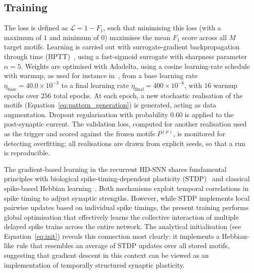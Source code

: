 \documentclass{scrartcl}
\newcommand{\citep}[1]{\parencite{#1}}
\begin{document}
\subsection{Training}
The loss is defined as $\mathcal{L} = 1 - F_1$, such that minimising this loss (with a maximum of $1$ and minimum of $0$) maximises the mean $F_1$ score across all $M$ target motifs. Learning is carried out with surrogate-gradient backpropagation through time (BPTT)~\citep{Neftci2019a}, using a fast-sigmoid surrogate with sharpness parameter $\alpha = 5$. Weights are optimised with Adadelta, using a cosine learning-rate schedule with warmup, as used for instance in~\citep{Hammouamri2023}, from a base learning rate $\eta_\mathrm{base} = 40.0 \times 10^{-3}$ to a final learning rate $\eta_\mathrm{final} = 400 \times 10^{-6}$, with $16$ warmup epochs over $256$ total epochs. At each epoch, a new stochastic realisation of the motifs (Equation~\ref{eq:pattern_generation}) is generated, acting as data augmentation. Dropout regularisation with probability $0.60$ is applied to the post-synaptic current. The validation loss, computed for another realisation used as the trigger and scored against the frozen motifs $P^{(\mu)}$, is monitored for detecting overfitting; all realisations are drawn from explicit seeds, so that a run is reproducible.

The gradient-based learning in the recurrent HD-SNN shares fundamental principles with biological spike-timing-dependent plasticity (STDP)~\citep{Izhikevich2006} and classical spike-based Hebbian learning~\citep{Perrinet2002}. Both mechanisms exploit temporal correlations in spike timing to adjust synaptic strengths. However, while STDP implements local pairwise updates based on individual spike timings, the present training performs global optimisation that effectively learns the collective interaction of multiple delayed spike trains across the entire network. The analytical initialisation (see Equation~\ref{eq:init}) reveals this connection most clearly: it implements a Hebbian-like rule that resembles an average of STDP updates over all stored motifs, suggesting that gradient descent in this context can be viewed as an implementation of temporally structured synaptic plasticity.
\end{document}
